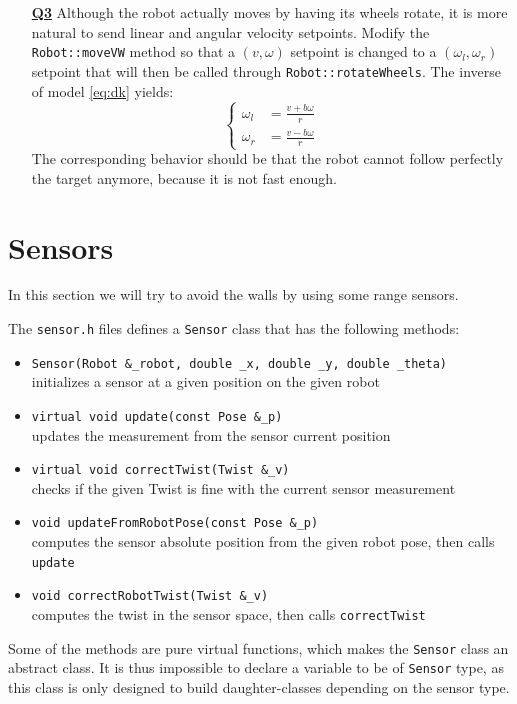 \documentclass{ecnreport}
\begin{document}
\begin{itemize}
\medskip\item[\textbf{\underline{Q3}}] Although the robot actually moves by having its wheels rotate, 
it is more natural to send linear and angular velocity setpoints. Modify the 
\texttt{Robot::moveVW} method so that a $(v,\omega)$ setpoint is changed to a $(\omega_l,\omega_r)$ setpoint that will then be called through \texttt{Robot::rotateWheels}.
 The inverse of model \eqref{eq:dk} yields:
\begin{equation}
\left\{\begin{array}{ll}
\omega_l &= \displaystyle \frac{v + b\omega}{r} \\
\omega_r &= \displaystyle \frac{v - b\omega}{r}
\end{array}\right.
\end{equation} 
The corresponding behavior should be that the robot cannot follow perfectly the target anymore, because it is not fast enough.
\end{itemize}

%  
\newpage

\section{Sensors}

In this section we will try to avoid the walls by using some range sensors.

The \texttt{sensor.h} files defines a \texttt{Sensor} class that has the following methods:
\begin{itemize}
\item \texttt{Sensor(Robot \&\_robot, double \_x, double \_y, double \_theta)}\\initializes a sensor at a given position on the given robot
\item \texttt{virtual void update(const Pose \&\_p)}\\ updates the measurement from the sensor current position
\item \texttt{virtual void correctTwist(Twist \&\_v)}\\ checks if the given Twist is fine with the current sensor measurement
\item \texttt{void updateFromRobotPose(const Pose \&\_p)}\\ computes the sensor absolute position from the given robot pose, then calls \texttt{update}
\item \texttt{void correctRobotTwist(Twist \&\_v)}\\ computes the twist in the sensor space, then calls \texttt{correctTwist}
\end{itemize}
Some of the methods are pure virtual functions, which makes the \texttt{Sensor} class an abstract class.
It is thus impossible to declare a variable to be of \texttt{Sensor} type, as this class is only designed to build daughter-classes depending on the sensor type.
\end{document}
